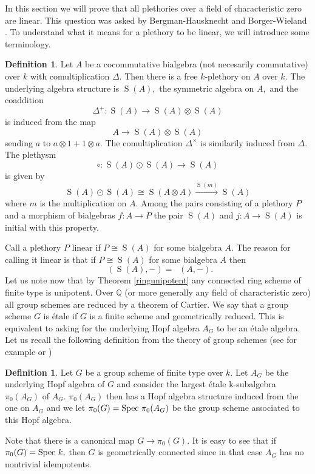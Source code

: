 \documentclass[a4paper, 12pt]{amsart}
\DeclareMathOperator{\Ringk}{Ring_k}
\DeclareMathOperator{\Modk}{Mod_k}
\DeclareMathOperator{\Sym}{S}
\numberwithin{equation}{section}
\theoremstyle{definition}
\newtheorem{definition}[theorem]{Definition}
\begin{document}
\noindent In this section we will prove that all plethories over a field of characteristic zero are linear. This question was asked by Bergman-Hausknecht \cite{BergmanHaus} and Borger-Wieland \cite{BW}.  To understand what it means for a plethory to be linear, we will introduce some terminology.
\begin{definition}
Let $A$ be a cocommutative bialgebra (not necesarily commutative) over $k$ with comultiplication $\Delta.$  Then there is a free $k$-plethory on $A$ over $k.$ The underlying algebra structure is $\Sym(A),$ the symmetric algebra on $A,$ and the coaddition $$\Delta^+: \Sym(A) \rightarrow \Sym(A) \otimes \Sym(A)$$ is induced from the map $$A \rightarrow \Sym(A) \otimes \Sym(A)$$ sending $a$ to $a \otimes 1 + 1 \otimes a.$ The comultiplication $\Delta^\times$ is similarily induced from $\Delta.$ The plethysm $$\circ: \Sym(A) \odot \Sym(A) \rightarrow \Sym(A)$$ is given by $$\Sym(A) \odot \Sym(A) \cong \Sym(A \otimes A) \xrightarrow{\Sym(m)} \Sym(A)$$ where $m$ is the multiplication on $A.$ Among the pairs consisting of a plethory $P$ and a morphism of bialgebras $f:A \rightarrow P$ the pair $\Sym(A)$ and $j:A \rightarrow \Sym(A)$ is initial with this property.
\end{definition}
\noindent Call a plethory $P$ linear if  $P \cong \Sym(A)$ for some bialgebra $A.$ The reason for calling it linear is that if $P \cong \Sym(A)$ for some bialgebra $A$ then $$\Ringk(\Sym(A),-) = \Modk(A,-).$$
Let us note now that by Theorem \ref{ringunipotent} any connected ring scheme of finite type is unipotent. Over $\mathbb{Q}$ (or more generally any field of characteristic zero) all group schemes are reduced by a theorem of Cartier. We say that a group scheme $G$ is étale if $G$ is a finite scheme and  geometrically reduced. This is equivalent to asking for the underlying Hopf algebra $A_G$ to be an étale algebra. Let us recall the following definition from the theory of group schemes (see for example \cite[II, $\mathsection 5,$ Proposition 1.8]{DemazureG} or \cite[Definition 9.4]{MilneiAG})
\begin{definition}
Let $G$ be a group scheme of finite type over $k.$ Let $A_G$ be the underlying Hopf algebra of $G$ and consider the largest étale k-subalgebra $\pi_0(A_G)$ of $A_G.$ $\pi_0(A_G)$ then has a Hopf algebra structure induced from the one on $A_G$ and we let $\pi_0(G) = \text{Spec } \pi_0(A_G)$ be the group scheme associated to this Hopf algebra. 
\end{definition}
\noindent Note that there is a canonical map $G \rightarrow \pi_0(G).$ It is easy to see that if $\pi_0(G)= \text{Spec } k,$ then $G$ is geometrically connected since in that case $A_G$ has no nontrivial idempotents.
\end{document}
